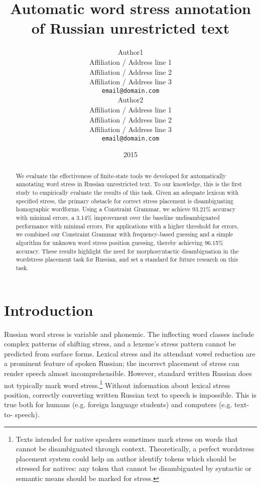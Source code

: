 \documentclass[11pt]{article}
\title{Automatic word stress annotation of Russian unrestricted text}
\author{Author1 \\
  Affiliation / Address line 1 \\
  Affiliation / Address line 2 \\
  Affiliation / Address line 3 \\
  {\tt email@domain.com} \\\And
  Author2 \\
  Affiliation / Address line 1 \\
  Affiliation / Address line 2 \\
  Affiliation / Address line 3 \\
  {\tt email@domain.com} \\}
\date{2015}
\begin{document}
\maketitle
\begin{abstract}
  We evaluate the effectiveness of finite-state tools we developed for 
  automatically annotating word stress in Russian unrestricted text. To our 
  knowledge, this is the first study to empirically evaluate the results of this 
  task. Given an adequate lexicon with specified stress, the primary obstacle for 
  correct stress placement is disambiguating homographic wordforms. Using a 
  Constraint Grammar, we achieve 93.21\% accuracy with minimal errors, a 3.14\% 
  improvement over the baseline undisambiguated performance with minimal errors. 
  For applications with a higher threshold for errors, we combined our Constraint 
  Grammar with frequency-based guessing and a simple
  algorithm for unknown word stress position guessing, thereby achieving 96.15\%
  accuracy. These results highlight the need for morphosyntactic disambiguation
  in the wordstress placement task for Russian, and set a standard for future
  research on this task.
\end{abstract}

%

\section{Introduction}

Russian word stress is variable and phonemic. The inflecting word classes include complex 
patterns of shifting stress, and a lexeme's stress pattern cannot be predicted 
from surface forms. Lexical stress and its attendant vowel reduction are 
a prominent feature of spoken Russian; the incorrect placement of stress
can render speech almost incomprehensible. However, standard written Russian does not 
typically mark word stress.\footnote{Texts intended for native speakers sometimes 
mark stress on words that cannot be disambiguated through context. Theoretically, 
a perfect wordstress placement system could help an author identify
tokens which should be stressed for natives: any token that cannot
be disambiguated by syntactic or semantic means should be marked for stress.} 
Without information about lexical stress position, 
correctly converting written Russian text to speech is impossible. This is true 
both for humans (e.g. foreign language students) and computers (e.g. text-to-
speech).
\end{document}
